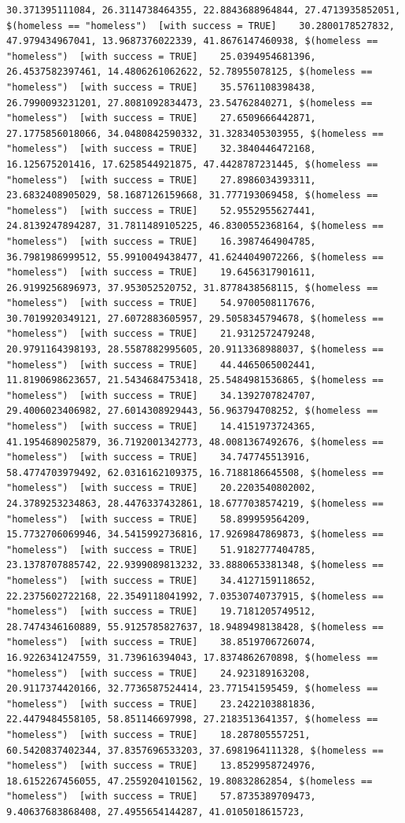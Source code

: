 \documentclass{tufte-book}\usepackage[]{graphicx}\usepackage[]{xcolor}
\makeatletter
\newenvironment{kframe}{%
 \def\at@end@of@kframe{}%
 \ifinner\ifhmode%
  \def\at@end@of@kframe{\end{minipage}}%
  \begin{minipage}{\columnwidth}%
 \fi\fi%
 \def\FrameCommand##1{\hskip\@totalleftmargin \hskip-\fboxsep
 \colorbox{shadecolor}{##1}\hskip-\fboxsep
     \hskip-\linewidth \hskip-\@totalleftmargin \hskip\columnwidth}%
 \MakeFramed {\advance\hsize-\width
   \@totalleftmargin\z@ \linewidth\hsize
   \@setminipage}}%
 {\par\unskip\endMakeFramed%
 \at@end@of@kframe}
\newenvironment{knitrout}{}{} %
\makeatother
\begin{document}
\begin{knitrout}
\begin{kframe}
\begin{verbatim}
30.371395111084, 26.3114738464355, 22.8843688964844, 27.4713935852051, $(homeless == "homeless")  [with success = TRUE]    30.2800178527832, 47.979434967041, 13.9687376022339, 41.8676147460938, $(homeless == "homeless")  [with success = TRUE]    25.0394954681396, 26.4537582397461, 14.4806261062622, 52.78955078125, $(homeless == "homeless")  [with success = TRUE]    35.5761108398438, 26.7990093231201, 27.8081092834473, 23.54762840271, $(homeless == "homeless")  [with success = TRUE]    27.6509666442871, 27.1775856018066, 34.0480842590332, 31.3283405303955, $(homeless == "homeless")  [with success = TRUE]    32.3840446472168, 16.125675201416, 17.6258544921875, 47.4428787231445, $(homeless == "homeless")  [with success = TRUE]    27.8986034393311, 23.6832408905029, 58.1687126159668, 31.777193069458, $(homeless == "homeless")  [with success = TRUE]    52.9552955627441, 24.8139247894287, 31.7811489105225, 46.8300552368164, $(homeless == "homeless")  [with success = TRUE]    16.3987464904785, 36.7981986999512, 55.9910049438477, 41.6244049072266, $(homeless == "homeless")  [with success = TRUE]    19.6456317901611, 26.9199256896973, 37.953052520752, 31.8778438568115, $(homeless == "homeless")  [with success = TRUE]    54.9700508117676, 30.7019920349121, 27.6072883605957, 29.5058345794678, $(homeless == "homeless")  [with success = TRUE]    21.9312572479248, 20.9791164398193, 28.5587882995605, 20.9113368988037, $(homeless == "homeless")  [with success = TRUE]    44.4465065002441, 11.8190698623657, 21.5434684753418, 25.5484981536865, $(homeless == "homeless")  [with success = TRUE]    34.1392707824707, 29.4006023406982, 27.6014308929443, 56.963794708252, $(homeless == "homeless")  [with success = TRUE]    14.4151973724365, 41.1954689025879, 36.7192001342773, 48.0081367492676, $(homeless == "homeless")  [with success = TRUE]    34.747745513916, 58.4774703979492, 62.0316162109375, 16.7188186645508, $(homeless == "homeless")  [with success = TRUE]    20.2203540802002, 24.3789253234863, 28.4476337432861, 18.6777038574219, $(homeless == "homeless")  [with success = TRUE]    58.899959564209, 15.7732706069946, 34.5415992736816, 17.9269847869873, $(homeless == "homeless")  [with success = TRUE]    51.9182777404785, 23.1378707885742, 22.9399089813232, 33.8880653381348, $(homeless == "homeless")  [with success = TRUE]    34.4127159118652, 22.2375602722168, 22.3549118041992, 7.03530740737915, $(homeless == "homeless")  [with success = TRUE]    19.7181205749512, 28.7474346160889, 55.9125785827637, 18.9489498138428, $(homeless == "homeless")  [with success = TRUE]    38.8519706726074, 16.9226341247559, 31.739616394043, 17.8374862670898, $(homeless == "homeless")  [with success = TRUE]    24.923189163208, 20.9117374420166, 32.7736587524414, 23.771541595459, $(homeless == "homeless")  [with success = TRUE]    23.2422103881836, 22.4479484558105, 58.851146697998, 27.2183513641357, $(homeless == "homeless")  [with success = TRUE]    18.287805557251, 60.5420837402344, 37.8357696533203, 37.6981964111328, $(homeless == "homeless")  [with success = TRUE]    13.8529958724976, 18.6152267456055, 47.2559204101562, 19.80832862854, $(homeless == "homeless")  [with success = TRUE]    57.8735389709473, 9.40637683868408, 27.4955654144287, 41.0105018615723, 
\end{verbatim}
\end{kframe}
\end{knitrout}
\end{document}
